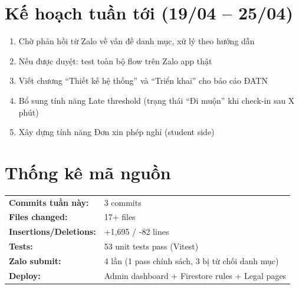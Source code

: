\documentclass{article}
\begin{document}
\section{Kế hoạch tuần tới (19/04 -- 25/04)}

\begin{enumerate}[leftmargin=1.5em]
  \item Chờ phản hồi từ Zalo về vấn đề danh mục, xử lý theo hướng dẫn
  \item Nếu được duyệt: test toàn bộ flow trên Zalo app thật
  \item Viết chương ``Thiết kế hệ thống'' và ``Triển khai'' cho báo cáo ĐATN
  \item Bổ sung tính năng Late threshold (trạng thái ``Đi muộn'' khi check-in sau X phút)
  \item Xây dựng tính năng Đơn xin phép nghỉ (student side)
\end{enumerate}

\section{Thống kê mã nguồn}

\begin{tabularx}{\textwidth}{@{}l X@{}}
\textbf{Commits tuần này:} & 3 commits \\
\textbf{Files changed:} & 17+ files \\
\textbf{Insertions/Deletions:} & +1,695 / -82 lines \\
\textbf{Tests:} & 53 unit tests pass (Vitest) \\
\textbf{Zalo submit:} & 4 lần (1 pass chính sách, 3 bị từ chối danh mục) \\
\textbf{Deploy:} & Admin dashboard + Firestore rules + Legal pages \\
\end{tabularx}
\end{document}
